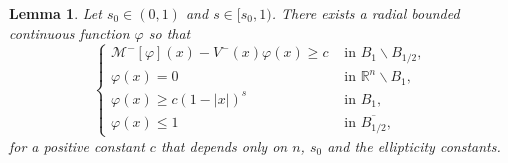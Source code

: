 \documentclass[10pt,a4paper]{amsart}
\newtheorem{lemma}{Lemma}
\begin{document}
\begin{lemma}\label{supersolucion}
Let $s_0\in(0,1)$ and $s\in[s_0,1)$. There exists a radial  bounded continuous function $\varphi$ so that
\begin{equation}\label{rosoton1}
\begin{cases}
    \mathcal{M}^{-}[\varphi](x) - V^{-}(x)\varphi(x) \geq c & \text{ in } B_{1} \backslash B_{1/2}, \\ 
    \varphi(x) = 0 & \text{ in } \mathbb{R}^{n} \backslash B_{1}, \\
    \varphi(x) \geq c(1-|x|)^{s} & \text{ in } B_{1}, \\
    \varphi(x) \leq 1 & \text{ in } \overline{B_{1/2}},
\end{cases}
\end{equation}
for a positive constant $c$ that depends only on $n$, $s_0$ and the ellipticity constants.
\end{lemma}
\end{document}
